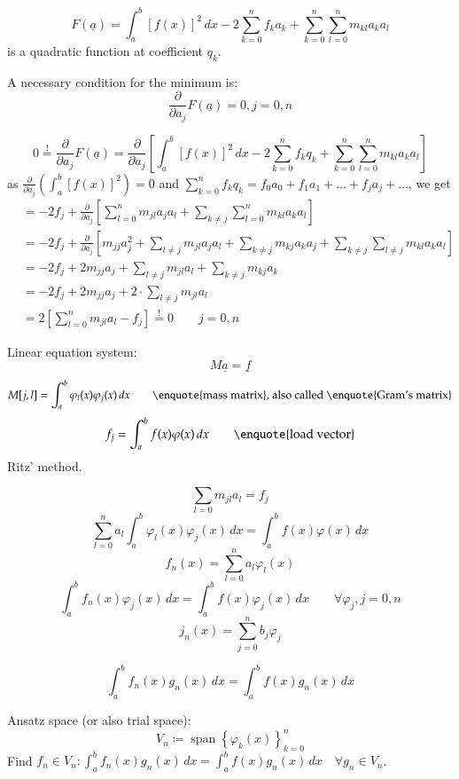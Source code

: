 \documentclass{article}
\begin{document}
\[ F(\underline{a}) = \int_a^b \left[f(x)\right]^2 \, dx - 2 \sum_{k=0}^n f_k a_k + \sum_{k=0}^n \sum_{l=0}^n m_{kl} a_k a_l \]
is a quadratic function at coefficient $q_k$.

A necessary condition for the minimum is:
\[ \frac{\partial}{\partial a_j} F(\underline{a}) = 0, j = 0,n \]

\[ 0 \stackrel{!}{=} \frac{\partial}{\partial a_j} F(\underline{a}) = \frac{\partial}{\partial a_j} \left[ \int_a^b \left[f(x)\right]^2 \, dx - 2 \sum_{k=0}^n f_k q_k + \sum_{k=0}^n \sum_{l=0}^n m_{kl} a_k a_l \right] \]
as $\frac{\partial}{\partial a_j}(\int_a^b \left[f(x)\right]^2) = 0$ and $\sum_{k=0}^n f_k q_k = f_0 a_0 + f_1 a_1 + \ldots + f_j a_j + \ldots$, we get
\begin{align*}
  &= -2 f_j + \frac{\partial}{\partial a_j} \left[ \sum_{l=0}^n m_{jl} a_j a_l + \sum_{k\neq j} \sum_{l=0}^n m_{kl} a_k a_l \right] \\
  &= -2 f_j + \frac{\partial}{\partial a_j} \left[ m_{jj} a_j^2 + \sum_{l\neq j} m_{jl} a_j a_l + \sum_{k\neq j} m_{kj} a_k a_j + \sum_{k\neq j} \sum_{l \neq j} m_{kl} a_k a_l \right] \\
  &= -2 f_j + 2 m_{jj} a_j + \sum_{l\neq j} m_{jl} a_l + \sum_{k \neq j} m_{kj} a_k \\
  &= -2 f_j + 2 m_{jj} a_j + 2 \cdot \sum_{l\neq j} m_{jl} a_l \\
  &= 2 \left[ \sum_{l=0}^n m_{jl} a_l - f_j \right] \stackrel{!}{=} 0 \qquad j = 0,n
\end{align*}

Linear equation system:
\[ M \underline{a} = \underline{f} \]
\[ M[j,l] = \int_a^b \varphi_l(x) \varphi_j(x) \, dx \qquad \text{\enquote{mass matrix}, also called \enquote{Gram's matrix}} \]
\[ f_j = \int_a^b f(x) \varphi(x) \, dx \qquad \text{\enquote{load vector}} \] %
Ritz' method.

\[ \sum_{l=0} m_{jl} a_l = f_j \]
\[ \sum_{l=0}^n a_l \int_a^b \varphi_l(x) \varphi_j(x) \, dx = \int_a^b f(x) \varphi(x) \, dx \]
\[ f_n(x) = \sum_{l=0}^n a_l \varphi_l(x) \]
\[ \int_a^b f_n(x) \varphi_j(x) \, dx = \int_a^b f(x) \varphi_j(x) \, dx \qquad \forall \varphi_j, j = 0, n \]
\[ j_n(x) = \sum_{j=0}^n b_j \varphi_j \]

\[ \int_a^b f_n(x) g_n(x) \, dx = \int_a^b f(x) g_n(x) \, dx \]

Ansatz space (or also trial space):
\[ V_n \coloneqq \operatorname{span}\left\{ \varphi_k(x) \right\}_{k=0}^n \]
Find $f_n \in V_n: \int_a^b f_n(x) g_n(x) \, dx = \int_a^b f(x) g_n(x) \, dx \quad \forall g_n \in V_n$.
\end{document}
